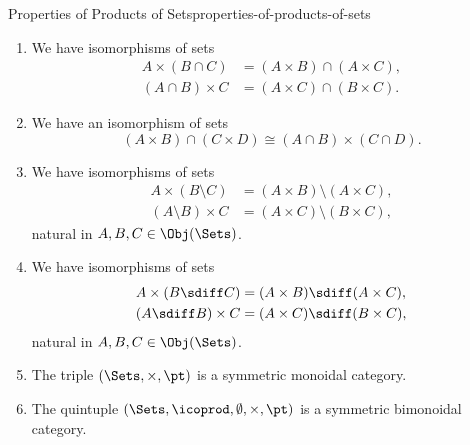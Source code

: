 \begin{proposition}{Properties of Products of Sets}{properties-of-products-of-sets}
\begin{enumerate}
            \begin{align*}
                A\times(B\cup C)  &= (A\times B)\cup(A\times C),\\
                (A\cup B)\times C &= (A\times C)\cup(B\times C).
            \end{align*}
        \item\label{properties-of-products-of-sets-distributivity-over-intersections}We have isomorphisms of sets
            \begin{align*}
                A\times(B\cap C)  &= (A\times B)\cap(A\times C),\\
                (A\cap B)\times C &= (A\times C)\cap(B\times C).
            \end{align*}
        \item\label{properties-of-products-of-sets-middle-four-exchange-with-respect-to-intersections}We have an isomorphism of sets
            \[
                (A\times B)\cap(C\times D)%
                \cong%
                (A\cap B)\times(C\cap D).%
            \]%
        \item\label{properties-of-products-of-sets-distributivity-over-differences}We have isomorphisms of sets
            \begin{align*}
                A\times(B\setminus C)  &= (A\times B)\setminus(A\times C),\\
                (A\setminus B)\times C &= (A\times C)\setminus(B\times C),
            \end{align*}
            natural in $A,B,C\in\Obj(\Sets)$.
        \item\label{properties-of-products-of-sets-distributivity-over-symmetric-differences}We have isomorphisms of sets
            \begin{align*}
                A\times(B\sdiff C)  &= (A\times B)\sdiff(A\times C),\\
                (A\sdiff B)\times C &= (A\times C)\sdiff(B\times C),
            \end{align*}
            natural in $A,B,C\in\Obj(\Sets)$.
        \item\label{properties-of-products-of-sets-symmetric-monoidality}The triple $(\Sets,\times,\pt)$ is a symmetric monoidal category.
        \item\label{properties-of-products-of-sets-symmetric-bimonoidality}The quintuple $(\Sets,\icoprod,\emptyset,\times,\pt)$ is a symmetric bimonoidal category.
    \end{enumerate}
\end{proposition}
